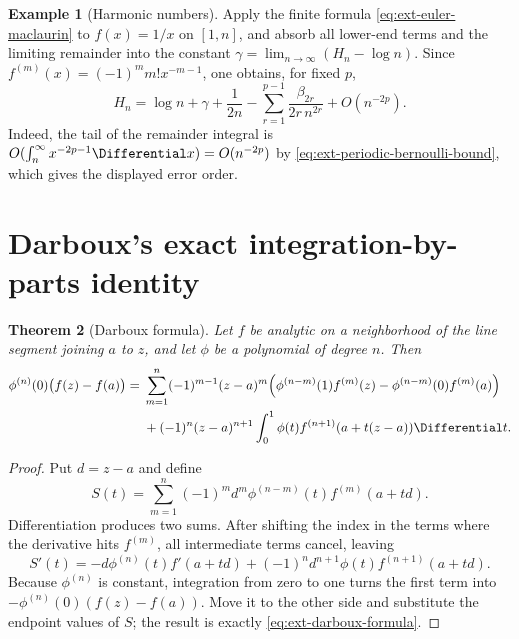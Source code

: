 \documentclass[11pt,a4paper,oneside,openany]{book}
\newtheorem{theorem}{Theorem}[chapter]
\theoremstyle{definition}
\newtheorem{example}[theorem]{Example}
\theoremstyle{remark}
\begin{document}
\begin{example}[Harmonic numbers]
Apply the finite formula \eqref{eq:ext-euler-maclaurin} to \(f(x)=1/x\) on
\([1,n]\), and absorb all lower-end terms and the limiting remainder into the
constant \(\gamma=\lim_{n\to\infty}(H_n-\log n)\).  Since
\(f^{(m)}(x)=(-1)^m m!x^{-m-1}\), one obtains, for fixed \(p\),
\begin{equation}\label{eq:ext-harmonic-asymptotic}
 H_n=\log n+\gamma+\frac1{2n}
 -\sum_{r=1}^{p-1}\frac{\beta_{2r}}{2r\,n^{2r}}
 +O(n^{-2p}).
\end{equation}
Indeed, the tail of the remainder integral is
\(O(\int_n^\infty x^{-2p-1}\Differential x)=O(n^{-2p})\) by
\eqref{eq:ext-periodic-bernoulli-bound}, which gives the displayed error
order.
\end{example}

\section{Darboux's exact integration-by-parts identity}

\begin{theorem}[Darboux formula]
\label{thm:ext-darboux-formula}
Let \(f\) be analytic on a neighborhood of the line segment joining \(a\) to
\(z\), and let \(\phi\) be a polynomial of degree \(n\).  Then
\begin{align}
 \phi^{(n)}(0)\bigl(f(z)-f(a)\bigr)
 ={}&\sum_{m=1}^n(-1)^{m-1}(z-a)^m
 \Bigl(\phi^{(n-m)}(1)f^{(m)}(z)
       -\phi^{(n-m)}(0)f^{(m)}(a)\Bigr)
 \notag\\
 &+(-1)^n(z-a)^{n+1}
 \int_0^1\phi(t)f^{(n+1)}(a+t(z-a))\Differential t.
 \label{eq:ext-darboux-formula}
\end{align}
\end{theorem}
\begin{proof}
Put \(d=z-a\) and define
\[
 S(t)=\sum_{m=1}^n(-1)^m d^m\phi^{(n-m)}(t)
 f^{(m)}(a+td).
\]
Differentiation produces two sums.  After shifting the index in the terms where
the derivative hits \(f^{(m)}\), all intermediate terms cancel, leaving
\begin{equation}\label{eq:ext-darboux-telescope}
 S'(t)=-d\phi^{(n)}(t)f'(a+td)
 +(-1)^nd^{n+1}\phi(t)f^{(n+1)}(a+td).
\end{equation}
Because \(\phi^{(n)}\) is constant, integration from zero to one turns the
first term into
\(-\phi^{(n)}(0)(f(z)-f(a))\).  Move it to the other side and substitute the
endpoint values of \(S\); the result is exactly
\eqref{eq:ext-darboux-formula}.
\end{proof}
\end{document}
